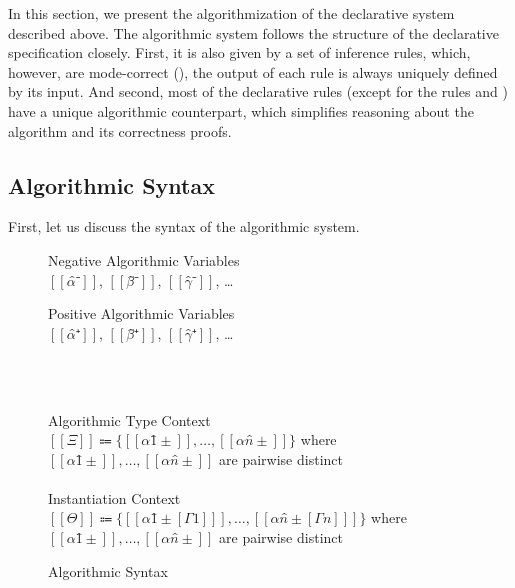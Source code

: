 \label{sec:algorithm}

In this section, we present the algorithmization of the declarative system described above.
The algorithmic system follows the structure of the declarative specification closely.
First, it is also given by a set of inference rules, which, however,
are mode-correct (\cite{dunfield2020:bidirectional}), \ie
the output of each rule is always uniquely defined by its input.
And second, most of the declarative rules 
(except for the rules  and )
have a unique algorithmic counterpart, 
which simplifies reasoning about the algorithm and its correctness proofs.


\subsection{Algorithmic Syntax}
\label{sec:algo-syntax}

First, let us discuss the syntax of the algorithmic system. 

\begin{figure}[t]

  \begin{minipage}[t]{0.49\textwidth}
      Negative Algorithmic Variables\\
      $[[α̂⁻]]$, $[[β̂⁻]]$, $[[γ̂⁻]]$, \dots\\
  \end{minipage}%
  \begin{minipage}[t]{0.49\textwidth}
      Positive Algorithmic Variables\\
      $[[α̂⁺]]$, $[[β̂⁺]]$, $[[γ̂⁺]]$, \dots\\
  \end{minipage}

  \hfill\\
  \begin{minipage}[t]{0.49\textwidth}
      \ottuNShort
  \end{minipage}
  \begin{minipage}[t]{0.49\textwidth}
      \ottuPShort
  \end{minipage}
  \hfill\\
  Algorithmic Type Context\\
   $[[Ξ]] \Coloneqq \{[[α1̂±]], \dots, [[αn̂±]]\}$ where $[[α1̂±]], \dots, [[αn̂±]]$ are pairwise distinct \\
  \hfill\\
  Instantiation Context\\
   $[[Θ]] \Coloneqq \{[[ α1̂±[Γ1] ]], \dots, [[ αn̂±[Γn] ]]\}$ where $[[α1̂±]], \dots, [[αn̂±]]$ are pairwise distinct \\
  \caption{Algorithmic Syntax}
  \label{fig:algo-syntax}
\end{figure}

